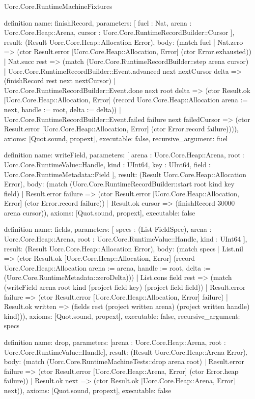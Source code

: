 \begin{lexlean}{Uorc.Core.RuntimeMachineFixtures}
\begin{semanticmodule}
definition{
  name: finishRecord,
  parameters: [
    fuel : Nat,
    arena : Uorc.Core.Heap::Arena,
    cursor : Uorc.Core.RuntimeRecordBuilder::Cursor
  ],
  result: (Result Uorc.Core.Heap::Allocation Error),
  body: (match fuel
    | Nat.zero => (ctor Result.error [Uorc.Core.Heap::Allocation, Error] (ctor Error.exhausted))
    | Nat.succ rest => (match (Uorc.Core.RuntimeRecordBuilder::step arena cursor)
      | Uorc.Core.RuntimeRecordBuilder::Event.advanced next nextCursor delta => (finishRecord rest next nextCursor)
      | Uorc.Core.RuntimeRecordBuilder::Event.done next root delta => (ctor Result.ok [Uorc.Core.Heap::Allocation, Error] (record Uorc.Core.Heap::Allocation {arena := next, handle := root, delta := delta}))
      | Uorc.Core.RuntimeRecordBuilder::Event.failed failure next failedCursor => (ctor Result.error [Uorc.Core.Heap::Allocation, Error] (ctor Error.record failure)))),
  axioms: [Quot.sound, propext],
  executable: false,
  recursive_argument: fuel
}

definition{
  name: writeField,
  parameters: [
    arena : Uorc.Core.Heap::Arena,
    root : Uorc.Core.RuntimeValue::Handle,
    kind : UInt64,
    key : UInt64,
    field : Uorc.Core.RuntimeMetadata::Field
  ],
  result: (Result Uorc.Core.Heap::Allocation Error),
  body: (match (Uorc.Core.RuntimeRecordBuilder::start root kind key field)
    | Result.error failure => (ctor Result.error [Uorc.Core.Heap::Allocation, Error] (ctor Error.record failure))
    | Result.ok cursor => (finishRecord 30000 arena cursor)),
  axioms: [Quot.sound, propext],
  executable: false
}

definition{
  name: fields,
  parameters: [
    specs : (List FieldSpec),
    arena : Uorc.Core.Heap::Arena,
    root : Uorc.Core.RuntimeValue::Handle,
    kind : UInt64
  ],
  result: (Result Uorc.Core.Heap::Allocation Error),
  body: (match specs
    | List.nil => (ctor Result.ok [Uorc.Core.Heap::Allocation, Error] (record Uorc.Core.Heap::Allocation {arena := arena, handle := root, delta := (Uorc.Core.RuntimeMetadata::zeroDelta)}))
    | List.cons field rest => (match (writeField arena root kind (project field key) (project field field))
      | Result.error failure => (ctor Result.error [Uorc.Core.Heap::Allocation, Error] failure)
      | Result.ok written => (fields rest (project written arena) (project written handle) kind))),
  axioms: [Quot.sound, propext],
  executable: false,
  recursive_argument: specs
}

definition{
  name: drop,
  parameters: [arena : Uorc.Core.Heap::Arena, root : Uorc.Core.RuntimeValue::Handle],
  result: (Result Uorc.Core.Heap::Arena Error),
  body: (match (Uorc.Core.RuntimeMachineTests::drop arena root)
    | Result.error failure => (ctor Result.error [Uorc.Core.Heap::Arena, Error] (ctor Error.heap failure))
    | Result.ok next => (ctor Result.ok [Uorc.Core.Heap::Arena, Error] next)),
  axioms: [Quot.sound, propext],
  executable: false
}


\end{semanticmodule}
\end{lexlean}
